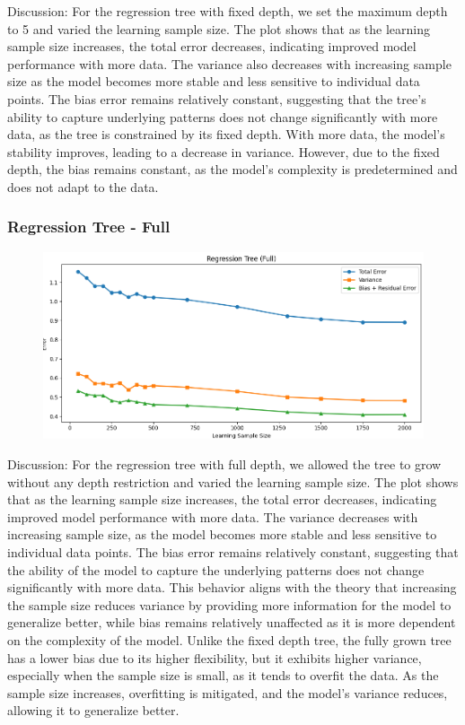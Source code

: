 \documentclass[a4paper,10pt]{article}
\begin{document}
Discussion:  
For the regression tree with fixed depth, we set the maximum depth to 5 and varied the learning sample size. The plot shows that as the learning sample size increases, the total error decreases, indicating improved model performance with more data. The variance also decreases with increasing sample size as the model becomes more stable and less sensitive to individual data points. The bias error remains relatively constant, suggesting that the tree's ability to capture underlying patterns does not change significantly with more data, as the tree is constrained by its fixed depth. With more data, the model's stability improves, leading to a decrease in variance. However, due to the fixed depth, the bias remains constant, as the model's complexity is predetermined and does not adapt to the data.

\subsubsection{Regression Tree - Full}

\begin{figure}[H]
    \centering
    \includegraphics[width=0.8\linewidth]{2.4_rt_full.png}
\end{figure}

Discussion:  
For the regression tree with full depth, we allowed the tree to grow without any depth restriction and varied the learning sample size. The plot shows that as the learning sample size increases, the total error decreases, indicating improved model performance with more data. The variance decreases with increasing sample size, as the model becomes more stable and less sensitive to individual data points. The bias error remains relatively constant, suggesting that the ability of the model to capture the underlying patterns does not change significantly with more data. This behavior aligns with the theory that increasing the sample size reduces variance by providing more information for the model to generalize better, while bias remains relatively unaffected as it is more dependent on the complexity of the model. Unlike the fixed depth tree, the fully grown tree has a lower bias due to its higher flexibility, but it exhibits higher variance, especially when the sample size is small, as it tends to overfit the data. As the sample size increases, overfitting is mitigated, and the model's variance reduces, allowing it to generalize better.




    
        
\end{document}
